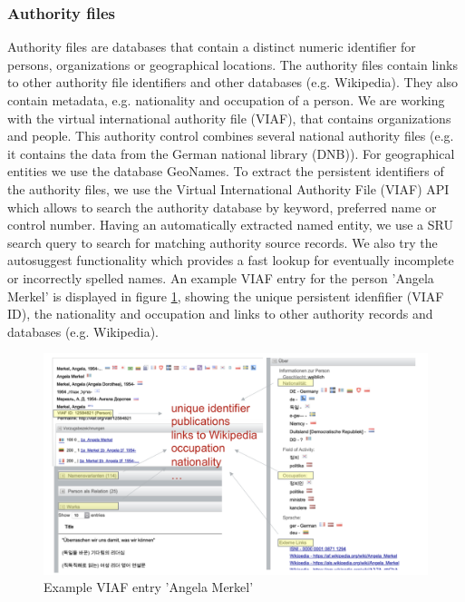 \documentclass{article}
\begin{document}
\subsubsection{Authority files}
Authority files are databases that contain a distinct numeric identifier for persons, organizations or geographical locations. The authority files contain links to other authority file identifiers and other databases (e.g. Wikipedia). They also contain metadata, e.g. nationality and occupation of a person. We are working with the virtual international authority file (VIAF), that contains organizations and people. This authority control combines several national authority files (e.g. it contains the data from the German national library (DNB)). For geographical entities we use the database GeoNames. 
To extract the persistent identifiers of the authority files, we use the Virtual International Authority File (VIAF) API which allows to search the authority database by keyword, preferred name or control number. Having an automatically extracted named entity, we use a SRU search query to search for matching authority source records. We also try the autosuggest functionality which provides a fast lookup for eventually incomplete or incorrectly spelled names. An example VIAF entry for the person 'Angela Merkel' is displayed in figure \ref{fig:agenlamerkel}, showing the unique persistent idenfifier (VIAF ID), the nationality and occupation and links to other authority records and databases (e.g. Wikipedia).
\begin{figure}
    \centering
    \includegraphics[width=\textwidth]{angela.png}
    \caption{Example VIAF entry 'Angela Merkel'}
    \label{fig:agenlamerkel}
\end{figure}
\end{document}
